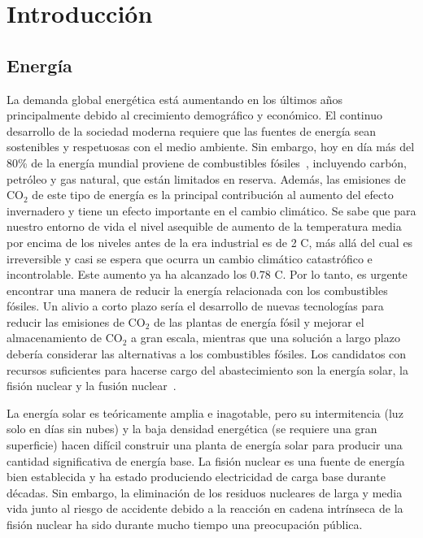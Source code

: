 \chapter{Introducción}\label{ch:intro}
\section{Energía}\label{sec:energy}
La demanda global energética está aumentando en los últimos años principalmente debido al crecimiento demográfico y económico.
El continuo desarrollo de la sociedad moderna requiere que las fuentes de energía sean sostenibles
y respetuosas con el medio ambiente. Sin embargo, hoy en día más del 80\% de la energía mundial proviene
de combustibles fósiles~\cite{/content/publication/caf32f3b-en}, incluyendo carbón, petróleo y gas natural, que están limitados en reserva.
Además, las emisiones de CO$_2$ de este tipo de energía es la principal contribución al aumento del 
efecto invernadero y tiene un efecto importante en el cambio climático. Se
sabe que para nuestro entorno de vida el nivel asequible de aumento de la
temperatura media por encima de los niveles antes de la era industrial es de 2 \centigrade C, más allá del cual es irreversible y casi
se espera que ocurra un cambio climático catastrófico e incontrolable. Este aumento ya ha alcanzado los 0.78 \centigrade C\cite{ip02000c}.
Por lo tanto, es urgente encontrar una manera de reducir la energía relacionada con
los combustibles fósiles. Un alivio a corto plazo sería el desarrollo de nuevas tecnologías para
reducir las emisiones de CO$_2$ de las plantas de energía fósil y mejorar el almacenamiento de CO$_2$ a gran escala,
mientras que una solución a largo plazo debería considerar las alternativas a los combustibles fósiles. Los candidatos con recursos suficientes para hacerse cargo del abastecimiento son la energía solar, la fisión nuclear y
la fusión nuclear~\cite{Freidberg:1186225}.\par
La energía solar es teóricamente amplia e inagotable, pero su intermitencia (luz solo en días sin nubes) y la baja densidad energética (se requiere una gran superficie) hacen difícil construir
una planta de energía solar para producir una cantidad significativa de energía base. La fisión nuclear es
una fuente de energía bien establecida y ha estado produciendo electricidad de carga base durante décadas.
Sin embargo, la eliminación de los residuos nucleares de larga y media vida junto al riesgo de accidente debido a la
reacción en cadena intrínseca de la fisión nuclear ha sido durante mucho tiempo una preocupación pública.\par
